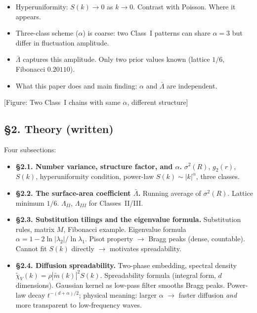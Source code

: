\documentclass[11pt]{article}
\newcommand{\fig}[1]{{\color{figcolor}\textsf{[Figure: #1]}}}
\newcommand{\Lb}{\bar\Lambda}
\begin{document}
\begin{itemize}[leftmargin=1.5em]
  \item Hyperuniformity: $S(k) \to 0$ as $k \to 0$.
        Contrast with Poisson. Where it appears.
  \item Three-class scheme ($\alpha$) is coarse: two Class~I patterns
        can share $\alpha = 3$ but differ in fluctuation amplitude.
  \item $\Lb$ captures this amplitude. Only two prior values known
        (lattice $1/6$, Fibonacci $0.20110$).
  \item What this paper does and main finding: $\alpha$ and $\Lb$
        are independent.
\end{itemize}

\fig{Two Class~I chains with same $\alpha$, different structure}

\subsection{\S2. Theory \textnormal{\small (written)}}

Four subsections:

\begin{itemize}[leftmargin=1.5em]
  \item \textbf{\S2.1. Number variance, structure factor, and $\alpha$.}
        $\sigma^2(R)$, $g_2(r)$, $S(k)$, hyperuniformity condition,
        power-law $S(k) \sim |k|^\alpha$, three classes.

  \item \textbf{\S2.2. The surface-area coefficient $\Lb$.}
        Running average of $\sigma^2(R)$. Lattice minimum $1/6$.
        $\Lambda_{II}$, $\Lambda_{III}$ for Classes~II/III.

  \item \textbf{\S2.3. Substitution tilings and the eigenvalue formula.}
        Substitution rules, matrix $M$, Fibonacci example.
        Eigenvalue formula $\alpha = 1 - 2\ln|\lambda_2|/\ln\lambda_1$.
        Pisot property $\to$ Bragg peaks (dense, countable).
        Cannot fit $S(k)$ directly $\to$ motivates spreadability.

  \item \textbf{\S2.4. Diffusion spreadability.}
        Two-phase embedding, spectral density
        $\tilde\chi_V(k) = \rho|\tilde m(k)|^2 S(k)$.
        Spreadability formula (integral form, $d$ dimensions).
        Gaussian kernel as low-pass filter smooths Bragg peaks.
        Power-law decay $t^{-(d+\alpha)/2}$; physical meaning:
        larger $\alpha$ $\to$ faster diffusion \emph{and} more
        transparent to low-frequency waves.
\end{itemize}
\end{document}
